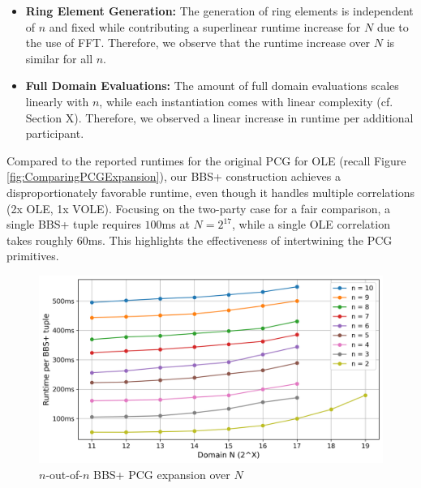 \begin{itemize}
    \item \textbf{Ring Element Generation:} The generation of ring elements is independent of $n$ and fixed while contributing a superlinear runtime increase for $N$ due to the use of FFT. Therefore, we observe that the runtime increase over $N$ is similar for all $n$.
    \item \textbf{Full Domain Evaluations:} The amount of full domain evaluations scales linearly with $n$, while each instantiation comes with linear complexity (cf. Section X). Therefore, we observed a linear increase in runtime per additional participant.
\end{itemize}

Compared to the reported runtimes for the original PCG for OLE (recall Figure \ref{fig:ComparingPCGExpansion}), our BBS+ construction achieves a disproportionately favorable runtime, even though it handles multiple correlations (2x OLE, 1x VOLE). Focusing on the two-party case for a fair comparison, a single BBS+ tuple requires $100$ms at $N=2^{17}$, while a single OLE correlation takes roughly $60$ms. This highlights the effectiveness of intertwining the PCG primitives.

\begin{figure}[t]
    \centering
    \includegraphics[scale=0.49]{images/plots/bbs_pcg_NoutofN.png}
    \caption{$n$-out-of-$n$ BBS+ PCG expansion over $N$}
    \label{fig:BBSnoutofn}
\end{figure}

